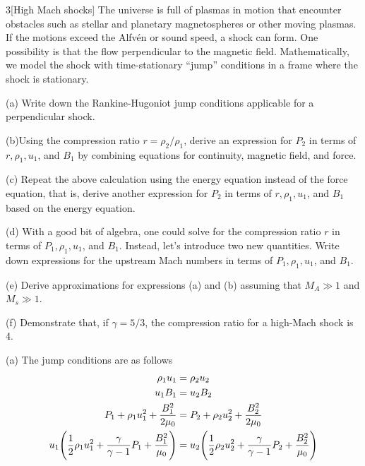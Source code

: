 \documentclass[12pt]{article}
\begin{document}
\begin{problem}{3}[High Mach shocks]
The universe is full of plasmas in motion that encounter obstacles such as
stellar and planetary magnetospheres or other moving plasmas. If the motions
exceed the Alfvén or sound speed, a shock can form. One possibility is that the
flow perpendicular to the magnetic field. Mathematically, we model the shock
with time-stationary ``jump'' conditions in a frame where the shock is
stationary. 

(a) Write down the Rankine-Hugoniot jump conditions applicable for a
perpendicular shock.

(b)Using the compression ratio $r=\rho_2/\rho_1$, derive an expression for $P_2$
in terms of $r,\rho_1,u_1$, and $B_1$ by combining equations for continuity,
magnetic field, and force.

(c) Repeat the above calculation using the energy equation instead of the force
equation, that is, derive another expression for $P_2$ in terms of
$r,\rho_1,u_1$, and $B_1$ based on the energy equation.

(d) With a good bit of algebra, one could solve for the compression ratio $r$ in
terms of $P_1,\rho_1,u_1$, and $B_1$. Instead, let's introduce two new
quantities. Write down expressions for the upstream Mach numbers in terms of
$P_1,\rho_1,u_1$, and $B_1$.

(e) Derive approximations for expressions (a) and (b) assuming that $M_A\gg1$
and $M_s\gg1$.

(f) Demonstrate that, if $\gamma=5/3$, the compression ratio for a high-Mach
shock is 4.
\begin{solution}
(a) The jump conditions are as follows
\begin{subequations}
    \begin{align}
        \rho_1u_1&=\rho_2u_2\label{p3a:continuity}\\
        u_1B_1&=u_2B_2\label{p3a:maxwell}\\
        P_1+\rho_1u_1^2+\frac{B_1^2}{2\mu_0}&=P_2+\rho_2u_2^2+\frac{B_2^2}{2\mu_0}\label{p3a:force}\\
        u_1\qty(\frac12\rho_1u_1^2+\frac{\gamma}{\gamma-1}P_1+\frac{B_1^2}{\mu_0})&=u_2\qty(\frac12\rho_2u_2^2+\frac{\gamma}{\gamma-1}P_2+\frac{B_2^2}{\mu_0})\label{p3a:energy}
    \end{align} 
\end{subequations}


\end{solution}
\end{problem}
\end{document}
